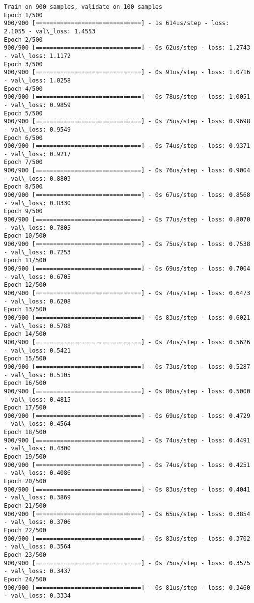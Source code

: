 \documentclass[11pt]{article}
\begin{document}
    \begin{Verbatim}[commandchars=\\\{\}]
Train on 900 samples, validate on 100 samples
Epoch 1/500
900/900 [==============================] - 1s 614us/step - loss: 2.1055 - val\_loss: 1.4553
Epoch 2/500
900/900 [==============================] - 0s 62us/step - loss: 1.2743 - val\_loss: 1.1172
Epoch 3/500
900/900 [==============================] - 0s 91us/step - loss: 1.0716 - val\_loss: 1.0258
Epoch 4/500
900/900 [==============================] - 0s 78us/step - loss: 1.0051 - val\_loss: 0.9859
Epoch 5/500
900/900 [==============================] - 0s 75us/step - loss: 0.9698 - val\_loss: 0.9549
Epoch 6/500
900/900 [==============================] - 0s 74us/step - loss: 0.9371 - val\_loss: 0.9217
Epoch 7/500
900/900 [==============================] - 0s 76us/step - loss: 0.9004 - val\_loss: 0.8803
Epoch 8/500
900/900 [==============================] - 0s 67us/step - loss: 0.8568 - val\_loss: 0.8330
Epoch 9/500
900/900 [==============================] - 0s 77us/step - loss: 0.8070 - val\_loss: 0.7805
Epoch 10/500
900/900 [==============================] - 0s 75us/step - loss: 0.7538 - val\_loss: 0.7253
Epoch 11/500
900/900 [==============================] - 0s 69us/step - loss: 0.7004 - val\_loss: 0.6705
Epoch 12/500
900/900 [==============================] - 0s 74us/step - loss: 0.6473 - val\_loss: 0.6208
Epoch 13/500
900/900 [==============================] - 0s 83us/step - loss: 0.6021 - val\_loss: 0.5788
Epoch 14/500
900/900 [==============================] - 0s 74us/step - loss: 0.5626 - val\_loss: 0.5421
Epoch 15/500
900/900 [==============================] - 0s 73us/step - loss: 0.5287 - val\_loss: 0.5105
Epoch 16/500
900/900 [==============================] - 0s 86us/step - loss: 0.5000 - val\_loss: 0.4815
Epoch 17/500
900/900 [==============================] - 0s 69us/step - loss: 0.4729 - val\_loss: 0.4564
Epoch 18/500
900/900 [==============================] - 0s 74us/step - loss: 0.4491 - val\_loss: 0.4300
Epoch 19/500
900/900 [==============================] - 0s 74us/step - loss: 0.4251 - val\_loss: 0.4086
Epoch 20/500
900/900 [==============================] - 0s 83us/step - loss: 0.4041 - val\_loss: 0.3869
Epoch 21/500
900/900 [==============================] - 0s 65us/step - loss: 0.3854 - val\_loss: 0.3706
Epoch 22/500
900/900 [==============================] - 0s 83us/step - loss: 0.3702 - val\_loss: 0.3564
Epoch 23/500
900/900 [==============================] - 0s 75us/step - loss: 0.3575 - val\_loss: 0.3437
Epoch 24/500
900/900 [==============================] - 0s 81us/step - loss: 0.3460 - val\_loss: 0.3334

\end{Verbatim}
\end{document}
